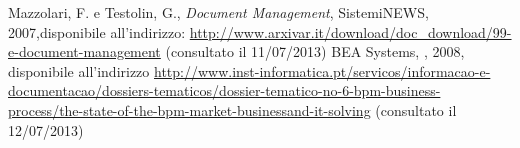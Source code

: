 \clearpage

\begin{thebibliography}{90}
   Mazzolari, F. e Testolin, G., \emph{Document Management}, SistemiNEWS, 2007,\newline disponibile all'indirizzo: \url{http://www.arxivar.it/download/doc_download/99-e-document-management} (consultato il 11/07/2013)
   BEA Systems, , 2008, \newline disponibile all'indirizzo \url{http://www.inst-informatica.pt/servicos/informacao-e-documentacao/dossiers-tematicos/dossier-tematico-no-6-bpm-business-process/the-state-of-the-bpm-market-businessand-it-solving} (consultato il 12/07/2013)
\end{thebibliography}


